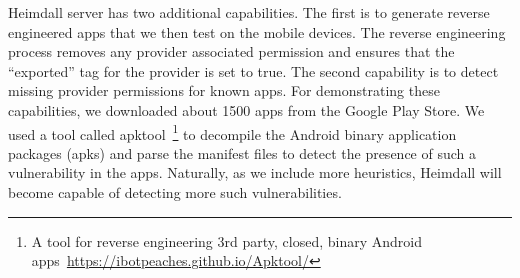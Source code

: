 Heimdall server has two additional capabilities. The first is to generate reverse engineered apps that we then test on the mobile devices. The reverse engineering process removes any provider associated permission and ensures that the ``exported'' tag for the provider is set to true. The second capability is to detect missing provider permissions for known apps. For demonstrating these capabilities, we downloaded about 1500 apps from the Google Play Store. We used a tool called apktool~\footnote{A tool for reverse engineering 3rd party, closed, binary Android apps~\url{https://ibotpeaches.github.io/Apktool/}} to decompile the Android binary application packages (apks) and parse the manifest files to detect the presence of such a vulnerability in the apps. Naturally, as we include more heuristics, Heimdall will become capable of detecting more such vulnerabilities.

